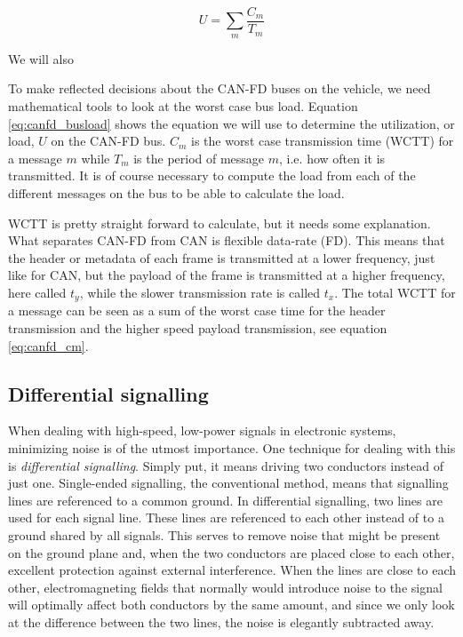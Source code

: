 \begin{equation}
    U=\sum_m\frac{C_m}{T_m}
    \label{eq:canfd_busload}
\end{equation}

We will also 

To make reflected decisions about the CAN-FD buses on the vehicle, we need mathematical tools to look at the worst case bus load. Equation \ref{eq:canfd_busload} shows the equation we will use to determine the utilization, or load, $U$ on the CAN-FD bus. $C_m$ is the worst case transmission time (WCTT) for a message $m$ while $T_m$ is the period of message $m$, i.e. how often it is transmitted. It is of course necessary to compute the load from each of the different messages on the bus to be able to calculate the load.



WCTT is pretty straight forward to calculate, but it needs some explanation. What separates CAN-FD from CAN is flexible data-rate (FD). This means that the header or metadata of each frame is transmitted at a lower frequency, just like for CAN, but the payload of the frame is transmitted at a higher frequency, here called $t_y$, while the slower transmission rate is called $t_x$. The total WCTT for a message can be seen as a sum of the worst case time for the header transmission and the higher speed payload transmission, see equation \ref{eq:canfd_cm}.


\subsection{Differential signalling}

When dealing with high-speed, low-power signals in electronic systems, minimizing noise is of the utmost importance. One technique for dealing with this is \emph{differential signalling}. Simply put, it means driving two conductors instead of just one. Single-ended signalling, the conventional method, means that signalling lines are referenced to a common ground. In differential signalling, two lines are used for each signal line. These lines are referenced to each other instead of to a ground shared by all signals. This serves to remove noise that might be present on the ground plane and, when the two conductors are placed close to each other, excellent protection against external interference. When the lines are close to each other, electromagneting fields that normally would introduce noise to the signal will optimally affect both conductors by the same amount, and since we only look at the difference between the two lines, the noise is elegantly subtracted away.